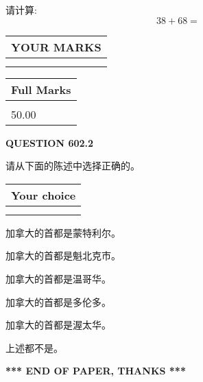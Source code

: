 \documentclass{ctexart}
\begin{document}
  
 
请计算:
\begin{equation}
38 +  %
68 = \nonumber
\end{equation}
 

 

 
  
\vspace{0.2in}
  
\noindent\begin{tabular}{|l|}
\hline
 YOUR MARKS  \\
\hline
 \\ 
 \\ 
\hline
\end{tabular}
\hspace{0.05in} \begin{tabular}{|l|}
\hline
 Full Marks  \\
\hline
 \\ 
50.00 \\
\hline
\end{tabular}
{\textbf{\Large{QUESTION
602.2 
}}}
  
  
请从下面的陈述中选择正确的。
  
  
\noindent\hspace{3.0in} \begin{tabular}{|l|}
\hline
Your choice \\
\hline
 \\ 
 \\ 
\hline
\end{tabular}
  
  
 
 
加拿大的首都是蒙特利尔。
 
 
加拿大的首都是魁北克市。
 
 
加拿大的首都是温哥华。
 
 
加拿大的首都是多伦多。
 
 
加拿大的首都是渥太华。
 
 
 上述都不是。
 
 
   
   
 \vspace{0.2in}
 
   
   
   
   
\vspace{1.0in} 
{\textbf{\large{ *** END OF PAPER, THANKS *** }}} 
   
\end{document}
